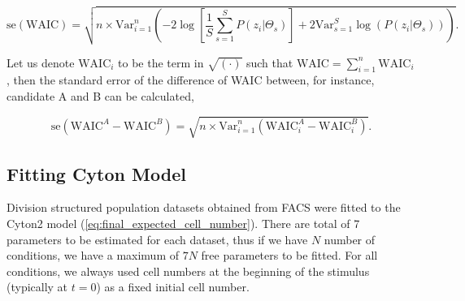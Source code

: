 \documentclass[11pt, a4paper]{article}
\begin{document}
\begin{linenomath*}
    \begin{equation}
        \mathrm{se}(\mathrm{WAIC}) =\sqrt{n \times \mathrm{Var}_{i=1}^n \left( -2\log\left[\frac{1}{S} \sum_{s=1}^S P(z_i|\Theta_s)\right] + 2\mathrm{Var}_{s=1}^S \log(P(z_i|\Theta_s)) \right)}.
    \end{equation}
\end{linenomath*}
Let us denote $\mathrm{WAIC}_i$ to be the term in $\sqrt{(\cdot)}$ such that $\mathrm{WAIC} = \sum_{i=1}^n \mathrm{WAIC}_i$, then the standard error of the difference of WAIC between, for instance, candidate A and B can be calculated,
\begin{linenomath*}
    \begin{equation*}
        \mathrm{se}(\mathrm{WAIC}^A - \mathrm{WAIC}^B) =\sqrt{n \times \mathrm{Var}_{i=1}^n \left(\mathrm{WAIC}_i^A - \mathrm{WAIC}_i^B \right)}.
    \end{equation*}
\end{linenomath*}

\nolinenumbers
\subsection{Fitting Cyton Model}
Division structured population datasets obtained from FACS were fitted to the Cyton2 model (\cref{eq:final_expected_cell_number}). There are total of 7 parameters to be estimated for each dataset, thus if we have $N$ number of conditions, we have a maximum of $7N$ free parameters to be fitted. For all conditions, we always used cell numbers at the beginning of the stimulus (typically at $t=0$) as a fixed initial cell number.
\end{document}
